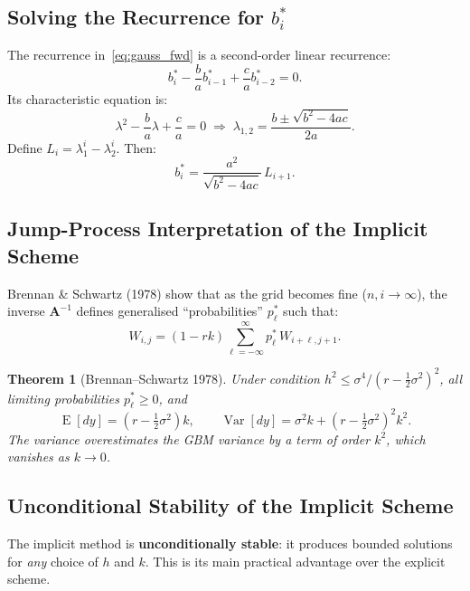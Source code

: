 \documentclass[12pt,a4paper]{article}
\theoremstyle{plain}
\newtheorem{theorem}{Theorem}[section]
\theoremstyle{definition}
\theoremstyle{remark}
\newcommand{\Var}{\operatorname{Var}}
\newcommand{\E}{\operatorname{E}}
\begin{document}
\subsection{Solving the Recurrence for $b_{i}^{*}$}

The recurrence in~\eqref{eq:gauss_fwd} is a second-order linear
recurrence:
\[
  b_{i}^{*}-\frac{b}{a}b_{i-1}^{*}+\frac{c}{a}b_{i-2}^{*}=0.
\]
Its characteristic equation is:
\[
  \lambda^{2}-\frac{b}{a}\lambda+\frac{c}{a}=0
  \;\Longrightarrow\;
  \lambda_{1,2}=\frac{b\pm\sqrt{b^{2}-4ac}}{2a}.
\]
Define $L_{i}=\lambda_{1}^{i}-\lambda_{2}^{i}$.  Then:
\[
  b_{i}^{*}=\frac{a^{2}}{\sqrt{b^{2}-4ac}}\,L_{i+1}.
\]

\subsection{Jump-Process Interpretation of the Implicit Scheme}

Brennan \& Schwartz (1978) show that as the grid becomes fine
($n,i\to\infty$), the inverse $\mathbf{A}^{-1}$ defines generalised
``probabilities'' $p_{\ell}^{*}$ such that:
\[
  W_{i,j}=(1-rk)\sum_{\ell=-\infty}^{\infty}p_{\ell}^{*}\,W_{i+\ell,j+1}.
\]

\begin{theorem}[Brennan--Schwartz 1978]
Under condition $h^{2}\leq\sigma^{4}/(r-\tfrac{1}{2}\sigma^{2})^{2}$,
all limiting probabilities $p_{\ell}^{*}\geq0$, and
\begin{equation}\label{eq:imp_moments}
  \E[dy]=\left(r-\tfrac{1}{2}\sigma^{2}\right)k,\qquad
  \Var[dy]=\sigma^{2}k+\left(r-\tfrac{1}{2}\sigma^{2}\right)^{2}k^{2}.
\end{equation}
The variance overestimates the GBM variance by a term of order $k^{2}$,
which vanishes as $k\to0$.
\end{theorem}

\subsection{Unconditional Stability of the Implicit Scheme}

\begin{keybox}
The implicit method is \textbf{unconditionally stable}: it produces
bounded solutions for \emph{any} choice of $h$ and $k$.  This is its
main practical advantage over the explicit scheme.
\end{keybox}

\end{document}
